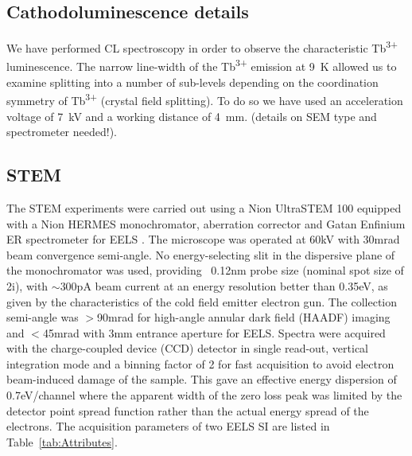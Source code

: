 \documentclass[%
aip,
rsi,%
 amsmath,amssymb,%
 reprint,%
]{revtex4-1}
\begin{document}
\subsection{Cathodoluminescence details}
\label{sec:CL}
We have performed CL spectroscopy in order to observe the characteristic Tb\textsuperscript{3+} luminescence. The narrow line-width of the Tb\textsuperscript{3+} emission at 9~K allowed us to examine splitting into a number of sub-levels depending on the coordination symmetry of Tb\textsuperscript{3+} (crystal field splitting). To do so we have used an acceleration voltage of 7~kV and a working distance of 4~mm. (details on SEM type and spectrometer needed!).

\subsection{STEM}
\label{sec:STEM}
The STEM experiments were carried out using a Nion UltraSTEM 100 equipped with a Nion HERMES monochromator, aberration corrector and Gatan Enfinium ER spectrometer for EELS \cite{Krivanek2013,Krivanek2015}. The microscope was operated at 60kV with 30mrad beam convergence semi-angle. No energy-selecting slit in the dispersive plane of the monochromator was used, providing  ~0.12nm probe size (nominal spot size of 2i), with $\sim$300pA beam current at an energy resolution better than 0.35eV, as given by the characteristics of the cold field emitter electron gun. The collection semi-angle was $>$90mrad for high-angle annular dark field (HAADF) imaging and $<$45mrad with 3mm entrance aperture for EELS. Spectra were acquired with the charge-coupled device (CCD) detector in single read-out, vertical integration mode and a binning factor of 2 for fast acquisition to avoid electron beam-induced damage of the sample. This gave an effective energy dispersion of 0.7eV/channel where the apparent width of the zero loss peak was limited by the detector point spread function rather than the actual energy spread of the electrons. The acquisition parameters of two EELS SI are listed in Table~\ref{tab:Attributes}.
\end{document}
